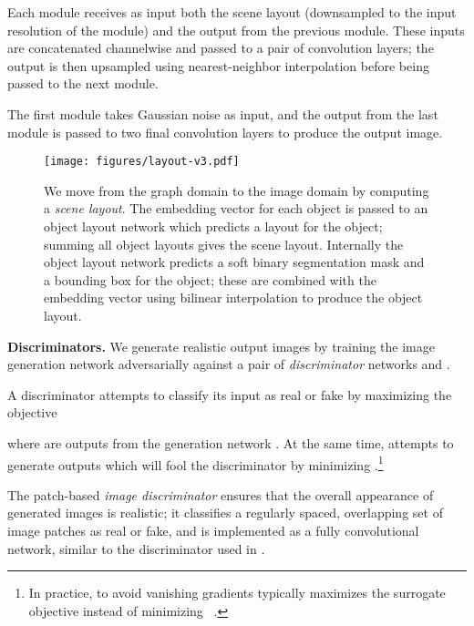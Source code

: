\documentclass[10pt,twocolumn,letterpaper]{article}
\begin{document}
Each module receives as input both the scene layout (downsampled to the input
resolution of the module) and the output from the previous module. These inputs
are concatenated channelwise and passed to a pair of  convolution
layers; the output is then upsampled using nearest-neighbor interpolation
before being passed to the next module.

The first module takes Gaussian noise  as input, and the output from the last
module is passed to two final convolution layers to produce the output image.

\begin{figure}[t]
  \centering
  \texttt{[image: figures/layout-v3.pdf]}
  \caption{
    We move from the graph domain to the image domain by computing a
    \emph{scene layout}. The embedding vector for each object is passed to an
    object layout network which predicts a layout for the object;
    summing all object layouts gives the scene layout. Internally the object
    layout network predicts a soft binary segmentation mask and a bounding box
    for the object; these are combined with the embedding vector using bilinear
    interpolation to produce the object layout.
  }
  \label{fig:layout}
\end{figure}

\textbf{Discriminators.}
We generate realistic output images by training the image generation network 
adversarially against a pair of \emph{discriminator} networks  and .

A discriminator  attempts to classify its input  as real or fake by maximizing
the objective~\cite{goodfellow2014generative}

where  are outputs from the generation network . At the same time,
 attempts to generate outputs which will fool the discriminator by minimizing
.\footnote{In practice, to avoid vanishing gradients  typically maximizes
the surrogate objective  instead of minimizing
~\cite{goodfellow2014generative}.}

The patch-based \emph{image discriminator}  ensures that the overall
appearance of generated images is realistic; it classifies a regularly spaced,
overlapping set of image patches as real or fake, and is implemented as a fully
convolutional network, similar to the discriminator used in \cite{isola2017image}.

\newlength{\qualsize}
\setlength{\qualsize}{0.1192\textwidth}

\newlength{\qualtext}
\setlength{\qualtext}{0.11\textwidth}
\end{document}

